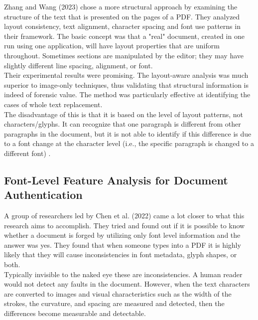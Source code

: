 \noindent Zhang and Wang (2023) chose a more structural approach by examining the structure of the text that is presented on the pages of a PDF. They analyzed layout consistency, text alignment, character spacing and font use patterns in their framework. The basic concept was that a "real" document, created in one run using one application, will have layout properties that are uniform throughout. Sometimes sections are manipulated by the editor; they may have slightly different line spacing, alignment, or font.\\

\noindent Their experimental results were promising. The layout-aware analysis was much superior to image-only techniques, thus validating that structural information is indeed of forensic value. The method was particularly effective at identifying the cases of whole text replacement.\\

\noindent The disadvantage of this is that it is based on the level of layout patterns, not characters/glyphs. It can recognize that one paragraph is different from other paragraphs in the document, but it is not able to identify if this difference is due to a font change at the character level (i.e., the specific paragraph is changed to a different font) \cite{Zhang2023PDFLayout}.\\

\subsection{Font-Level Feature Analysis for Document Authentication}

\noindent A group of researchers led by Chen et al. (2022) came a lot closer to what this research aims to accomplish. They tried and found out if it is possible to know whether a document is forged by utilizing only font level information and the answer was yes. They found that when someone types into a PDF it is highly likely that they will cause inconsistencies in font metadata, glyph shapes, or both.\\

\noindent Typically invisible to the naked eye these are inconsistencies. A human reader would not detect any faults in the document. However, when the text characters are converted to images and visual characteristics such as the width of the strokes, the curvature, and spacing are measured and detected, then the differences become measurable and detectable.\\

